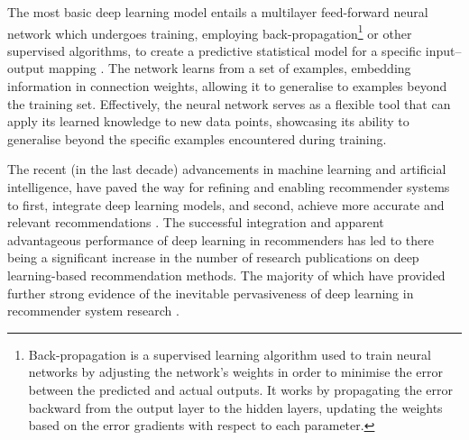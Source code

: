 The most basic deep learning model entails a multilayer feed-forward neural network which undergoes training, employing back-propagation\footnote{Back-propagation is a supervised learning algorithm used to train neural networks by adjusting the network's weights in order to minimise the error between the predicted and actual outputs. It works by propagating the error backward from the output layer to the hidden layers, updating the weights based on the error gradients with respect to each parameter.} or other supervised algorithms, to create a predictive statistical model for a specific input–output mapping \cite{zhang2019deep}. The network learns from a set of examples, embedding information in connection weights, allowing it to generalise to examples beyond the training set. Effectively, the neural network serves as a flexible tool that can apply its learned knowledge to new data points, showcasing its ability to generalise beyond the specific examples encountered during training.

The recent (in the last decade) advancements in machine learning and artificial intelligence, have paved the way for refining and enabling recommender systems to first, integrate deep learning models, and second, achieve more accurate and relevant recommendations \cite{he2017neural}. The successful integration and apparent advantageous performance of deep learning in recommenders has led to there being a significant increase in the number of research publications on deep learning-based recommendation methods. The majority of which have provided further strong evidence of the inevitable pervasiveness of deep learning in recommender system research \cite{zhang2019deep}.

